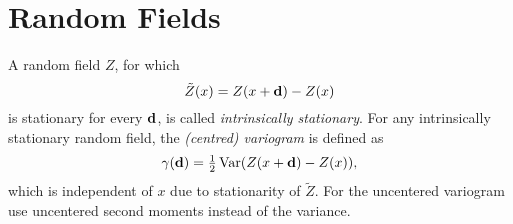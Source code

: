 \section{Random Fields}



\begin{definition}[Variogram]
	A random field \(Z\), for which
	\[
		\tilde{Z}(x) = Z(x+\mathbf{d})- Z(x)
	\]
	is stationary for every \(\mathbf{d}\), is called \emph{intrinsically stationary}.
	For any intrinsically stationary random field, the \emph{(centred) variogram} is
	defined as
	\[
		\gamma(\mathbf{d})	= \tfrac12\operatorname{Var}(Z(x+\mathbf{d})-Z(x)),
	\]
	which is independent of \(x\) due to stationarity of \(\tilde{Z}\). For the
	uncentered variogram use uncentered second moments instead of the variance.
\end{definition}

